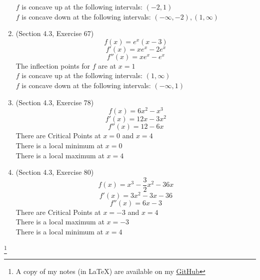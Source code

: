 \documentclass{article}
\newcommand\blfootnote[1]{
    \begingroup
    \renewcommand\thefootnote{}\footnote{#1}
    \addtocounter{footnote}{-1}
    \endgroup
}
\begin{document}
\begin{enumerate}
        $f$ is concave up at the following intervals: $(-2, 1)$ \\
        $f$ is concave down at the following intervals: $(-\infty, -2), (1, \infty)$
    \item (Section 4.3, Exercise 67)
        $$f(x) = e^x\left(x - 3\right)$$
        $$f'(x) = xe^x - 2e^x$$
        $$f''(x) = xe^x - e^x$$
        The inflection points for $f$ are at $x = 1$ \\
        $f$ is concave up at the following intervals: $(1, \infty)$ \\
        $f$ is concave down at the following intervals: $(-\infty, 1)$
    \item (Section 4.3, Exercise 78)
        $$f(x) = 6x^2 - x^3$$
        $$f'(x) = 12x - 3x^2$$
        $$f''(x) = 12 - 6x$$
        There are Critical Points at $x = 0$ and $x = 4$ \\
        There is a local minimum at $x = 0$ \\
        There is a local maximum at $x = 4$
    \item (Section 4.3, Exercise 80)
        $$f(x) = x^3 - \frac{3}{2}x^2 - 36x$$
        $$f'(x) = 3x^2 - 3x - 36$$
        $$f''(x) = 6x - 3$$
        There are Critical Points at $x = -3$ and $x = 4$ \\
        There is a local maximum at $x = -3$ \\
        There is a local minimum at $x = 4$
\end{enumerate}

\blfootnote{A copy of my notes (in \LaTeX) are available on my \href{https://github.com/onlinechronically/MATH-211}{GitHub}}
\end{document}
